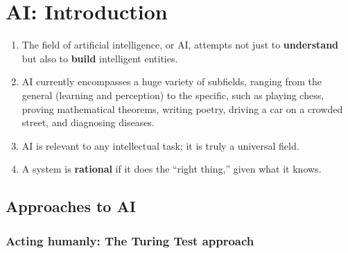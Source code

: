 \chapter{AI: Introduction}\label{Artificial Intelligence: Introduction}

\begin{enumerate}
    \item The field of artificial intelligence, or AI, attempts not just to \textbf{understand} but also to \textbf{build} intelligent entities.
    \hfill \cite{ai/book/Artificial-Intelligence-A-Modern-Approach/Russell-Norvig}

    \item AI currently encompasses a huge variety of subfields, ranging from the general (learning and perception) to the specific, such as playing chess, proving mathematical theorems, writing poetry, driving a car on a crowded street, and diagnosing diseases.
    \hfill \cite{ai/book/Artificial-Intelligence-A-Modern-Approach/Russell-Norvig}

    \item AI is relevant to any intellectual task; it is truly a universal field.
    \hfill \cite{ai/book/Artificial-Intelligence-A-Modern-Approach/Russell-Norvig}

    \item A system is \textbf{rational} if it does the “right thing,” given what it knows.
    \hfill \cite{ai/book/Artificial-Intelligence-A-Modern-Approach/Russell-Norvig}
\end{enumerate}






\section{Approaches to AI}\label{Artificial Intelligence: Introduction/Approaches to AI}

\subsection{Acting humanly: The Turing Test approach}\label{Artificial Intelligence: Introduction/Approaches to AI/Acting humanly: The Turing Test approach}


